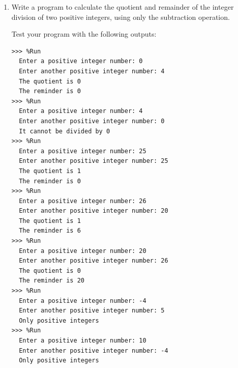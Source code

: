 \documentclass[
  fontsize=10pt,
  a4paper,
]{scrartcl}
\newenvironment{howTILEd}%
  {\begin{mdframed}[skipabove=10pt,skipbelow=10pt,backgroundcolor=pink!40]}%
  {\end{mdframed}}
\begin{document}
\begin{enumerate}
\begin{Verbatim}[frame=single, label={\em examples of test executions}]
>>> %Run 
  Enter an integer number: 0
  Enter another integer number: 0
  There are no divisors of 0
>>> %Run 
  Enter an integer number: 0
  Enter another integer number: 2
  2 is a divisor of 0
>>> %Run 
  Enter an integer number: 4
  Enter another integer number: 0
  4 is a divisor of 0
>>> %Run 
  Enter an integer number: -5
  Enter another integer number: 0
  -5 is a divisor of 0
>>> %Run 
  Enter an integer number: 0
  Enter another integer number: -6
  -6 is a divisor of 0
>>> %Run 
  Enter an integer number: 25
  Enter another integer number: 5
  5 is a divisor of 25
>>> %Run 
  Enter an integer number: 4
  Enter another integer number: 16
  4 is a divisor of 16
>>> %Run 
  Enter an integer number: 3
  Enter another integer number: 17
  3 is not a divisor of 17
>>> %Run 
  Enter an integer number: 17
  Enter another integer number: 4
  4 is not a divisor of 17
\end{Verbatim}


\begin{howTILEd}
Insist that the students test their programs by giving them example test executions. Note that the test cases have been chosen carefully to make sure we cover a lot of combinations and take 0 into account.
\end{howTILEd}





\item Write a program to calculate the quotient and remainder of the integer division of two positive integers, using only the subtraction operation.

Test your program with the following outputs:

\begin{Verbatim}[frame=single, label={\em examples of test executions}]
>>> %Run 
  Enter a positive integer number: 0
  Enter another positive integer number: 4
  The quotient is 0
  The reminder is 0
>>> %Run 
  Enter a positive integer number: 4
  Enter another positive integer number: 0
  It cannot be divided by 0
>>> %Run 
  Enter a positive integer number: 25
  Enter another positive integer number: 25
  The quotient is 1
  The reminder is 0
>>> %Run 
  Enter a positive integer number: 26
  Enter another positive integer number: 20
  The quotient is 1
  The reminder is 6
>>> %Run 
  Enter a positive integer number: 20
  Enter another positive integer number: 26
  The quotient is 0
  The reminder is 20
>>> %Run 
  Enter a positive integer number: -4
  Enter another positive integer number: 5
  Only positive integers
>>> %Run 
  Enter a positive integer number: 10
  Enter another positive integer number: -4
  Only positive integers
\end{Verbatim}


\end{enumerate}
\end{document}
